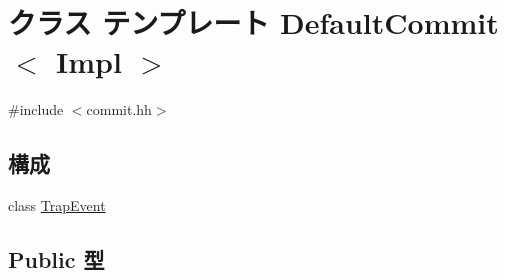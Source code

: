 \hypertarget{classDefaultCommit}{
\section{クラス テンプレート DefaultCommit$<$ Impl $>$}
\label{classDefaultCommit}
}


{\ttfamily \#include $<$commit.hh$>$}\subsection*{構成}
\begin{DoxyCompactItemize}
\item 
class \hyperlink{classDefaultCommit_1_1TrapEvent}{TrapEvent}
\end{DoxyCompactItemize}
\subsection*{Public 型}
